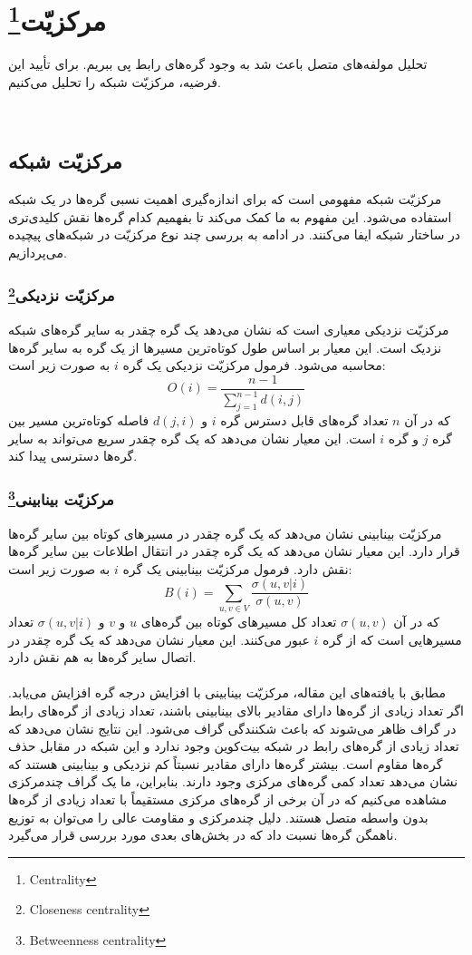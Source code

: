 ~\section{مرکزیّت\footnote{Centrality}}
تحلیل مولفه‌های متصل باعث شد به وجود گره‌های رابط پی ببریم. برای تأیید این فرضیه، مرکزیّت شبکه را تحلیل می‌کنیم.

~\subsection{مرکزیّت شبکه}
مرکزیّت شبکه مفهومی است که برای اندازه‌گیری اهمیت نسبی گره‌ها در یک شبکه استفاده می‌شود. این مفهوم به ما کمک می‌کند تا بفهمیم کدام گره‌ها نقش کلیدی‌تری در ساختار شبکه ایفا می‌کنند. در ادامه به بررسی چند نوع مرکزیّت در شبکه‌های پیچیده می‌پردازیم.

\subsubsection{مرکزیّت نزدیکی\footnote{Closeness centrality }}
مرکزیّت نزدیکی معیاری است که نشان می‌دهد یک گره چقدر به سایر گره‌های شبکه نزدیک است. این معیار بر اساس طول کوتاه‌ترین مسیرها از یک گره به سایر گره‌ها محاسبه می‌شود. فرمول مرکزیّت نزدیکی یک گره $i$ به صورت زیر است:
\[
O(i) = \frac{n-1}{\sum_{j=1}^{n-1} d(i, j)}
\]
که در آن $n$ تعداد گره‌های قابل دسترس گره $i$ و $d(j, i)$ فاصله کوتاه‌ترین مسیر بین گره $j$ و گره $i$ است. این معیار نشان می‌دهد که یک گره چقدر سریع می‌تواند به سایر گره‌ها دسترسی پیدا کند.

\subsubsection{مرکزیّت بینابینی\footnote{Betweenness centrality}}
مرکزیّت بینابینی نشان می‌دهد که یک گره چقدر در مسیرهای کوتاه بین سایر گره‌ها قرار دارد. این معیار نشان می‌دهد که یک گره چقدر در انتقال اطلاعات بین سایر گره‌ها نقش دارد. فرمول مرکزیّت بینابینی یک گره $i$ به صورت زیر است:
\[
B(i) = \sum_{u, v \in V} \frac{\sigma(u, v | i)}{\sigma(u, v)}
\]
که در آن $\sigma(u, v)$ تعداد کل مسیرهای کوتاه بین گره‌های $u$ و $v$ و $\sigma(u, v | i)$ تعداد مسیرهایی است که از گره $i$ عبور می‌کنند. این معیار نشان می‌دهد که یک گره چقدر در اتصال سایر گره‌ها به هم نقش دارد.
\\
\\
مطابق با یافته‌های این مقاله، مرکزیّت بینابینی با افزایش درجه گره افزایش می‌یابد. اگر تعداد زیادی از گره‌ها دارای مقادیر بالای بینابینی باشند، تعداد زیادی از گره‌های رابط در گراف ظاهر می‌شوند که باعث شکنندگی گراف می‌شود. این نتایج نشان می‌دهد که تعداد زیادی از گره‌های رابط در شبکه بیت‌کوین وجود ندارد و این شبکه در مقابل حذف گره‌ها مقاوم است. بیشتر گره‌ها دارای مقادیر نسبتاً کم نزدیکی و بینابینی هستند که نشان می‌دهد تعداد کمی گره‌های مرکزی وجود دارند. بنابراین، ما یک گراف چندمرکزی مشاهده می‌کنیم که در آن برخی از گره‌های مرکزی مستقیماً با تعداد زیادی از گره‌ها بدون واسطه متصل هستند. دلیل چندمرکزی و مقاومت عالی را می‌توان به توزیع ناهمگن گره‌ها نسبت داد که در بخش‌های بعدی مورد بررسی قرار می‌گیرد.


